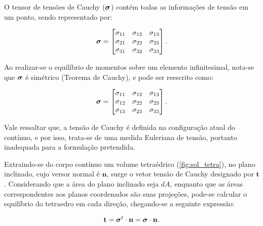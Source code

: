 O tensor de tensões de Cauchy ($\bm{\sigma}$) contém todas as informações de tensão em um ponto, sendo representado por:

\begin{align}
\bm{\sigma} =
\begin{bmatrix}
	\sigma_{11} & \sigma_{12} & \sigma_{13} \\
	\sigma_{21} & \sigma_{22} & \sigma_{23} \\
	\sigma_{31} & \sigma_{32} & \sigma_{33}
\end{bmatrix}
.
\end{align}

Ao realizar-se o equilíbrio de momentos sobre um elemento infinitesimal, nota-se que $\bm{\sigma}$ é simétrico (Teorema de Cauchy), e pode ser reescrito como:

\begin{align}
	\bm{\sigma} =
	\begin{bmatrix}
		\sigma_{11} & \sigma_{12} & \sigma_{13} \\
		\sigma_{12} & \sigma_{22} & \sigma_{23} \\
		\sigma_{13} & \sigma_{23} & \sigma_{33}
	\end{bmatrix}
	.
\end{align}

Vale ressaltar que, a tensão de Cauchy é definida na configuração atual do contínuo, e por isso, trata-se de uma medida Euleriana de tensão, portanto inadequada para a formulação pretendida.

Extraindo-se do corpo contínuo um volume tetraédrico (\autoref{fig:sol_tetra}), no plano inclinado, cujo versor normal é $\mathbf{n}$, surge o vetor tensão de Cauchy designado por $\mathbf{t}$. Considerando que a área do plano inclinado seja $dA$, enquanto que as áreas correspondentes aos planos coordenados são suas projeções, pode-se calcular o equilíbrio do tetraedro em cada direção, chegando-se a seguinte expressão:

\begin{align}
	\mathbf{t} = \bm{\sigma}^{t} \cdot \mathbf{n} =  \bm{\sigma} \cdot \mathbf{n}.
\end{align}

